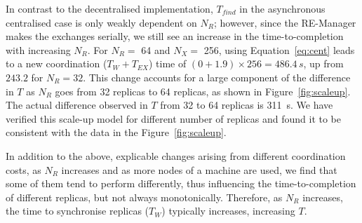 \documentclass{rspublic}
\newcommand{\jhanote}[1]{ {\textcolor{red} { ***shantenu: #1 }}}
\newcommand{\alnote}[1]{ {\textcolor{blue} { ***andre: #1 }}}
\newcommand{\athotanote}[1]{ {\textcolor{green} { ***athota: #1 }}}
\newcommand{\alnote}[1]{}
\newcommand{\athotanote}[1]{}
\newcommand{\jhanote}[1]{}
\begin{document}


In contrast to the decentralised implementation, $T_{find}$ in the
asynchronous centralised case is only weakly dependent on $N_R$; however,
since the RE-Manager makes the exchanges serially, we still see an
increase in the time-to-completion with increasing $N_R$. %
For $N_R =$ 64 and $N_X=$ 256, using Equation~\ref{eq:cent} leads to a
new coordination ($T_W + T_{EX}$) time of $(0+1.9) \times 256 =
486.4\,s$, up from $243.2$ for $N_R = 32$. This change accounts for a
large component of the difference in $T$ as $N_R$ goes from 32
replicas to 64 replicas, as shown in Figure~\ref{fig:scaleup}. The
actual difference observed in $T$ from 32 to 64 replicas is 311~s. We
have verified this scale-up model for different number of replicas and
found it to be consistent with the data in the Figure~\ref{fig:scaleup}. 

In addition to the above, explicable changes arising from different
coordination costs, as $N_R$ increases and as more nodes of a machine
are used, we find that some of them tend to perform differently, thus
influencing the time-to-completion of different replicas, but not
always monotonically. Therefore, as $N_R$ increases, the time to synchronise replicas ($T_W$)
typically increases, increasing $T$. %

\end{document}
